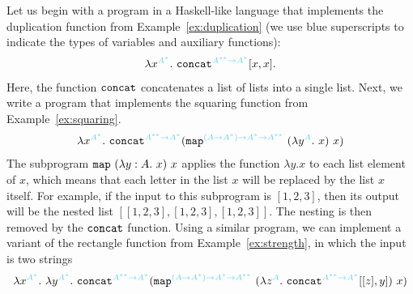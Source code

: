 


\begin{myexample} \label{ex:squaring-rectangle-duplication} Let us begin with a program in a Haskell-like language that implements the duplication function from Example~\ref{ex:duplication} (we use blue superscripts to indicate the types of  variables and  auxiliary functions):
    \begin{align*}
    \lambda \church x {\blue{A^*}}.\ \church \concatterm {\blue{A^{**} \to A^*}} [x,x].
    \end{align*}
Here, the function $\mathtt{concat}$ concatenates a list of lists into a single list. Next, we write a program that implements
     the squaring function from Example~\ref{ex:squaring}. 
    \begin{align*}
    \lambda x^{\blue{A^*}}.\ \concatterm^{\blue{A^{**} \to A^*}} (\mapterm^{\blue{(A \to A^*) \to A^* \to A^{**}}} \ (\lambda y^{\blue{A}}.\ x)\ x)
    \end{align*}
The subprogram $\mathtt{map} \ (\lambda y : A.\ x)\ x$ applies the function $\lambda y.x$ to each list element of $x$, which means that each letter in the list $x$ will be replaced by the list $x$ itself. For example, if the input to this subprogram is $[1,2,3]$, then its output will be the nested list $[[1,2,3],[1,2,3],[1,2,3]]$. The nesting is then removed by the $\mathtt{concat}$ function. 
Using a similar program, we can implement a variant of the rectangle function from Example~\ref{ex:strength}, in which the input is two strings
\begin{align*}
    \lambda x^{\blue{A^*}}.\  \lambda y^{\blue{A^*}}. \  \concatterm^{\blue{A^{**} \to A^*}} ( \mapterm^{\blue{(A \to A^*) \to A^* \to A^{**}}} \ ( \lambda z^{\blue{A}} . \ \concatterm^{\blue{A^{**} \to A^*}} [[z],y] ) \ x )
  \end{align*}
\end{myexample}


